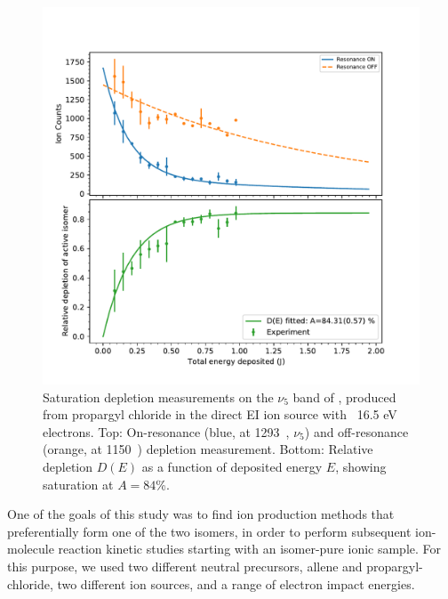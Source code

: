 \begin{figure}
	
	\centering
		\includegraphics[scale=.7]{chapters/C3H3+ and C3D3+/figures/scan2.pdf}
	\caption{Saturation depletion measurements on the $\nu_5$ band of \cyc, produced from propargyl chloride in the direct EI ion source with ~16.5 eV electrons. Top: On-resonance (blue, at 1293~\wnn, $\nu_5$) and off-resonance (orange, at 1150~\wnn) depletion measurement. Bottom: Relative depletion $D(E)$ as a function of deposited energy $E$, showing saturation at $A=84$\%. }
	\label{FIG:depletion1}
	
\end{figure}

One of the goals of this study was to find ion production methods that preferentially form one of the two \iso isomers, in order to perform subsequent ion-molecule reaction kinetic studies starting with an isomer-pure ionic sample. For this purpose, we used two different neutral precursors, allene and propargyl-chloride, two different ion sources, and a range of electron impact energies.\\

